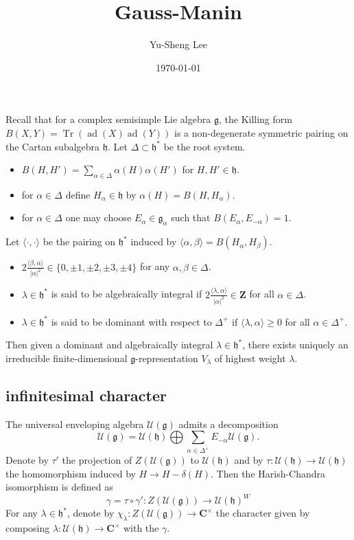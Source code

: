\documentclass[leqno]{amsart}
\DeclareMathOperator{\adj}{ad}
\newcommand{\Z}{{\mathbf{Z}}}
\newcommand{\C}{\mathbf C}
\DeclareMathOperator{\Tr}{Tr}
\newcommand{\1}{\mathbf{1}}
\newcommand{\cfg}{\mathfrak{g}}
\newcommand{\cfh}{\mathfrak{h}}
\newcommand{\rt}{\Delta}
\theoremstyle{definition}
\theoremstyle{remark}
\begin{document}
\title{Gauss-Manin}
\author[Y-S.~Lee]{Yu-Sheng Lee}
\address{Department of Mathematics, University  of Michigan, Ann Arbor, MI 48109, USA}
\date{\today}

\maketitle
\setcounter{tocdepth}{1}
\tableofcontents


Recall that for a complex semisimple Lie algebra $\cfg$,
the Killing form  $B(X,Y)=\Tr(\adj(X)\adj(Y))$
is a non-degenerate symmetric pairing on
the Cartan subalgebra $\cfh$.
Let $\rt\subset\cfh^*$ be the root system.
\begin{itemize}
	\item $B(H,H')=\sum_{\alpha\in\rt}\alpha(H)\alpha(H')$
		for $H,H'\in \cfh$.
	\item for $\alpha\in\rt$ define $H_\alpha\in\cfh$ by
		$\alpha(H)=B(H,H_\alpha)$.
	\item for $\alpha\in\rt$ one may choose
		$E_\alpha\in \cfg_\alpha$
		such that $B(E_\alpha,E_{-\alpha})=1$.
\end{itemize}
Let $\langle\cdot,\cdot\rangle$
be the pairing on $\cfh^*$ induced by
$\langle\alpha,\beta\rangle=B(H_\alpha,H_\beta)$.
\begin{itemize}
	\item $2\frac{\langle\beta,\alpha\rangle}{|\alpha|^2}
		\in\{0,\pm1,\pm2,\pm3,\pm4\}$
		for any $\alpha,\beta\in\rt$.
	\item  $\lambda\in \cfh^*$ is said to be
		algebraically integral if 
		$2\frac{\langle\lambda,\alpha\rangle}
		{|\alpha|^2}\in\Z$
		for all $\alpha\in\rt$.
	\item $\lambda\in \cfh^*$ is said to be
		dominant with respect to  $\rt^+$
		if $\langle\lambda,\alpha\rangle\geq0$
		for all $\alpha\in\rt^+$.
\end{itemize}
Then given a dominant and algebraically integral
$\lambda\in\cfh^*$,
there exists uniquely an irreducible finite-dimensional 
$\cfg$-representation  $V_\lambda$ of highest weight $\lambda$.


\subsection{infinitesimal character}
The universal enveloping algebra
$\mathcal{U}(\cfg)$
admits a decomposition
\[
	\mathcal{U}(\cfg)=
	\mathcal{U}(\cfh)\bigoplus 
	\sum_{\alpha\in\Delta^+}E_{-\alpha}\mathcal{U}(\cfg).
\]
Denote by $\tau'$
the projection of $Z(\mathcal{U}(\cfg))$ to $\mathcal{U}(\cfh)$
and by $\tau\colon \mathcal{U}(\cfh)\to\mathcal{U}(\cfh)$ 
the homomorphism induced by $H\to H-\delta(H)$.
Then the Harish-Chandra isomorphism is defined as
\[
	\gamma=\tau\circ\gamma'\colon Z(\mathcal{U}(\cfg))\to
	\mathcal{U}(\cfh)^W
\]
For any $\lambda\in\cfh^*$,
denote by $\chi_\lambda\colon Z(\mathcal{U}(\cfg))\to\C^\times$
the character given by composing 
$\lambda\colon \mathcal{U}(\cfh)\to \C^\times$
with the $\gamma$.
\end{document}
